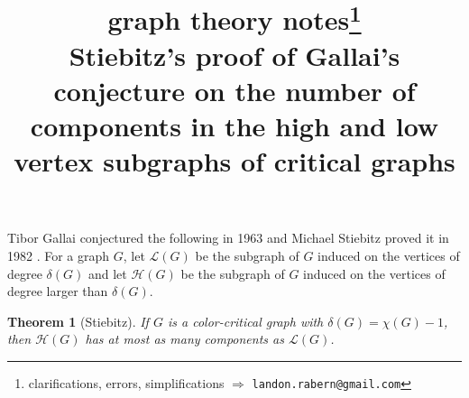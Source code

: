 \documentclass[12pt]{article}
\title{graph theory notes\thanks{clarifications, errors, simplifications $\Rightarrow$ \texttt{landon.rabern@gmail.com}}\\ \bigskip
Stiebitz's proof of Gallai's conjecture on the number of components in the high and low vertex subgraphs of critical graphs}
\date{}
\theoremstyle{plain}
\newtheorem*{Theorem}{Theorem}
\theoremstyle{definition}
\theoremstyle{remark}
\newcommand{\fancy}[1]{\mathcal{#1}}
\renewcommand{\L}{\fancy{L}}
\def\L{\fancy{L}}
\def\H{\fancy{H}}
\begin{document}
\maketitle

Tibor Gallai conjectured the following in 1963 \cite{gallai1963kritische, gallai1963kritische2} and Michael Stiebitz proved it in 1982 \cite{stiebitz1982proof}.  For a graph $G$,
let $\L(G)$ be the subgraph of $G$ induced on the vertices of degree $\delta(G)$ and let $\H(G)$ be the subgraph of $G$ induced on the vertices of degree larger than $\delta(G)$.

\begin{Theorem}[Stiebitz]
If $G$ is a color-critical graph with $\delta(G) = \chi(G) - 1$, then $\H(G)$ has at most as many components as $\L(G)$.
\end{Theorem}
\end{document}
